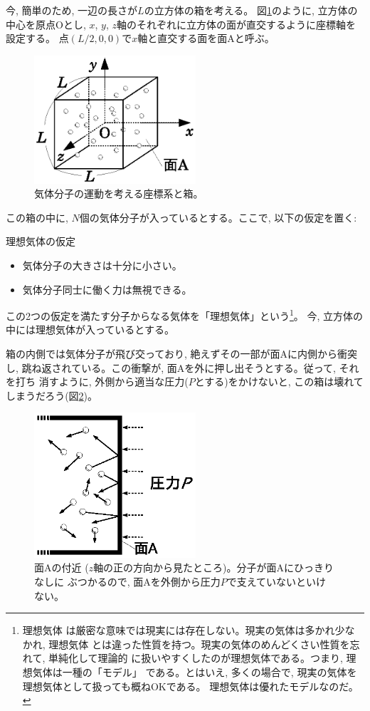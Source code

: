 今, 簡単のため, 一辺の長さが$L$の立方体の箱を考える。
図\ref{fig:gas_motion}のように, 立方体の中心を原点Oとし, 
$x$, $y$, $z$軸のそれぞれに立方体の面が直交するように座標軸を設定する。
点$(L/2, 0, 0)$で$x$軸と直交する面を面Aと呼ぶ。
\begin{figure}[h]
    \centering
    \includegraphics[width=6cm]{gas_motion.eps}
    \caption{気体分子の運動を考える座標系と箱。}\label{fig:gas_motion}
\end{figure}

この箱の中に, $N$個の気体分子が入っているとする。ここで, 以下の仮定を置く:
\begin{itembox}{理想気体の仮定}
\begin{itemize}
\item 気体分子の大きさは十分に小さい。
\item 気体分子同士に働く力は無視できる。
\end{itemize}
\end{itembox}
この2つの仮定を満たす分子からなる気体を「理想気体」という\footnote{理想気体
は厳密な意味では現実には存在しない。現実の気体は多かれ少なかれ, 理想気体
とは違った性質を持つ。現実の気体のめんどくさい性質を忘れて, 単純化して理論的
に扱いやすくしたのが理想気体である。つまり, 理想気体は一種の「モデル」
である。とはいえ, 多くの場合で, 現実の気体を理想気体として扱っても概ねOKである。
理想気体は優れたモデルなのだ。}。
今, 立方体の中には理想気体が入っているとする。

箱の内側では気体分子が飛び交っており, 絶えずその一部が面Aに内側から衝突し, 
跳ね返されている。この衝撃が, 面Aを外に押し出そうとする。従って, それを打ち
消すように, 外側から適当な圧力($P$とする)をかけないと, この箱は壊れて
しまうだろう(図\ref{fig:gas_motionA})。

\begin{figure}[h]
    \centering
    \includegraphics[width=6cm]{gas_motionA.eps}
    \caption{面Aの付近 ($z$軸の正の方向から見たところ)。分子が面Aにひっきりなしに
ぶつかるので, 面Aを外側から圧力$P$で支えていないといけない。}\label{fig:gas_motionA}
\end{figure}

